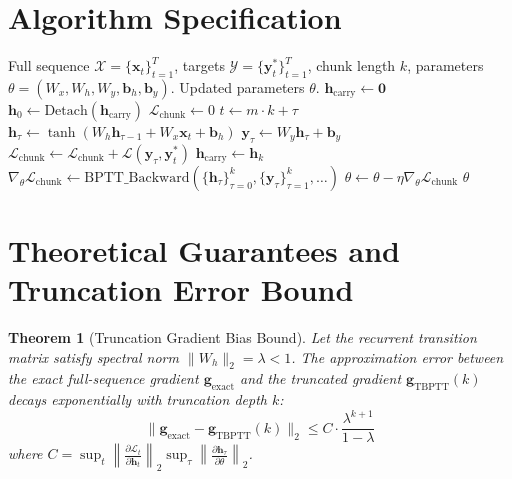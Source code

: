 \documentclass[11pt,a4paper]{article}
\newtheorem{theorem}{Theorem}
\theoremstyle{definition}
\begin{document}
\section{Algorithm Specification}

\begin{algorithm}[H]
\caption{Truncated Backpropagation Through Time (TBPTT$(k, k)$)}
\label{alg:tbptt}
\begin{algorithmic}[1]
\Require Full sequence $\mathcal{X} = \{\mathbf{x}_t\}_{t=1}^T$, targets $\mathcal{Y} = \{\mathbf{y}_t^*\}_{t=1}^T$, chunk length $k$, parameters $\theta = (W_x, W_h, W_y, \mathbf{b}_h, \mathbf{b}_y)$.
\Ensure Updated parameters $\theta$.
\State $\mathbf{h}_{\text{carry}} \gets \mathbf{0}$
    \State $\mathbf{h}_0 \gets \text{Detach}(\mathbf{h}_{\text{carry}})$
    \State $\mathcal{L}_{\text{chunk}} \gets 0$
     
        \State $t \gets m \cdot k + \tau$
        \State $\mathbf{h}_\tau \gets \tanh(W_h \mathbf{h}_{\tau-1} + W_x \mathbf{x}_t + \mathbf{b}_h)$
        \State $\mathbf{y}_\tau \gets W_y \mathbf{h}_\tau + \mathbf{b}_y$
        \State $\mathcal{L}_{\text{chunk}} \gets \mathcal{L}_{\text{chunk}} + \mathcal{L}(\mathbf{y}_\tau, \mathbf{y}_t^*)$
    \EndFor
    \State $\mathbf{h}_{\text{carry}} \gets \mathbf{h}_k$ 
    \State $\nabla_\theta \mathcal{L}_{\text{chunk}} \gets \text{BPTT\_Backward}(\{\mathbf{h}_\tau\}_{\tau=0}^k, \{\mathbf{y}_\tau\}_{\tau=1}^k, \dots)$
    \State $\theta \gets \theta - \eta \nabla_\theta \mathcal{L}_{\text{chunk}}$
\EndFor
\State \Return $\theta$
\end{algorithmic}
\end{algorithm}

\section{Theoretical Guarantees and Truncation Error Bound}

\begin{theorem}[Truncation Gradient Bias Bound]
\label{thm:tbptt_bias}
Let the recurrent transition matrix satisfy spectral norm $\|W_h\|_2 = \lambda < 1$. The approximation error between the exact full-sequence gradient $\mathbf{g}_{\text{exact}}$ and the truncated gradient $\mathbf{g}_{\text{TBPTT}}(k)$ decays exponentially with truncation depth $k$:
\begin{equation}
\|\mathbf{g}_{\text{exact}} - \mathbf{g}_{\text{TBPTT}}(k)\|_2 \le C \cdot \frac{\lambda^{k+1}}{1 - \lambda}
\end{equation}
where $C = \sup_t \left\| \frac{\partial \mathcal{L}_t}{\partial \mathbf{h}_t} \right\|_2 \sup_\tau \left\| \frac{\partial \mathbf{h}_\tau}{\partial \theta} \right\|_2$.
\end{theorem}
\end{document}
